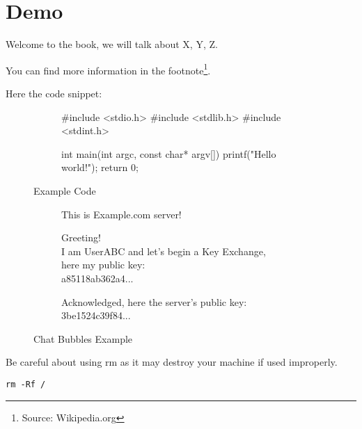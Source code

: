 \chapter*{Demo}

Welcome to the book, we will talk about X, Y, Z.

You can find more information in the footnote\footnote{Source: Wikipedia.org}.

Here the code snippet:

\begin{figure}[h!]
\centering
\begin{subfigure}[b]{0.5\linewidth}
\begin{ccode}
#include <stdio.h>
#include <stdlib.h>
#include <stdint.h>

int main(int argc, const char* argv[])
{
    printf("Hello world!\n");
    return 0;
}
\end{ccode}
\end{subfigure}
\caption{Example Code}
\end{figure}

\begin{figure}[h!]
\centering
\begin{subfigure}[b]{0.75\linewidth}
\begin{leftbubbles}
This is Example.com server!
\end{leftbubbles}
\begin{rightbubbles}
Greeting! \\
I am UserABC and let's begin a Key Exchange, \\
here my public key: \\
a85118ab362a4...
\end{rightbubbles}
\begin{leftbubbles}
Acknowledged, here the server's public key: \\
3be1524c39f84...
\end{leftbubbles}
\end{subfigure}
\caption{Chat Bubbles Example}
\end{figure}

\begin{warning}[title=Warning]
Be careful about using \ttfamily rm \sffamily as it may destroy your machine if used improperly.
\end{warning}


\begin{alert}[title=\textbf{Do not run the following command, you may destroy your machine}]
\texttt{rm -Rf /}
\end{alert}
